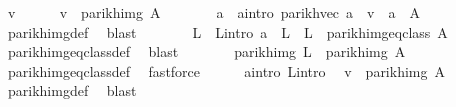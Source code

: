 \begin{isabellebody}
\ v\isanewline
\ \ \ \ \isamarkupfalse%
\ {\isachardoublequoteopen}v\ {\isasymin}\ parikh{\isacharunderscore}{\kern0pt}img\ {\isacharquery}{\kern0pt}A{\isacharprime}{\kern0pt}{\isachardoublequoteclose}\isanewline
\ \ \ \ \isamarkupfalse%
\ \isamarkupfalse%
\ a\ \ a{\isacharunderscore}{\kern0pt}intro{\isacharcolon}{\kern0pt}\ {\isachardoublequoteopen}parikh{\isacharunderscore}{\kern0pt}vec\ a\ {\isacharequal}{\kern0pt}\ v\ {\isasymand}\ a\ {\isasymin}\ {\isacharquery}{\kern0pt}A{\isacharprime}{\kern0pt}{\isachardoublequoteclose}\isanewline
\ \ \ \ \ \ \isamarkupfalse%
\ parikh{\isacharunderscore}{\kern0pt}img{\isacharunderscore}{\kern0pt}def\ \isamarkupfalse%
\ blast\isanewline
\ \ \ \ \isamarkupfalse%
\ \isamarkupfalse%
\ L\ \ L{\isacharunderscore}{\kern0pt}intro{\isacharcolon}{\kern0pt}\ {\isachardoublequoteopen}a\ {\isasymin}\ L\ {\isasymand}\ L\ {\isasymin}\ parikh{\isacharunderscore}{\kern0pt}img{\isacharunderscore}{\kern0pt}eq{\isacharunderscore}{\kern0pt}class\ A{\isachardoublequoteclose}\isanewline
\ \ \ \ \ \ \isamarkupfalse%
\ parikh{\isacharunderscore}{\kern0pt}img{\isacharunderscore}{\kern0pt}eq{\isacharunderscore}{\kern0pt}class{\isacharunderscore}{\kern0pt}def\ \isamarkupfalse%
\ blast\isanewline
\ \ \ \ \isamarkupfalse%
\ \isamarkupfalse%
\ {\isachardoublequoteopen}parikh{\isacharunderscore}{\kern0pt}img\ L\ {\isacharequal}{\kern0pt}\ parikh{\isacharunderscore}{\kern0pt}img\ A{\isachardoublequoteclose}\ \isamarkupfalse%
\ parikh{\isacharunderscore}{\kern0pt}img{\isacharunderscore}{\kern0pt}eq{\isacharunderscore}{\kern0pt}class{\isacharunderscore}{\kern0pt}def\ \isamarkupfalse%
\ fastforce\isanewline
\ \ \ \ \isamarkupfalse%
\ a{\isacharunderscore}{\kern0pt}intro\ L{\isacharunderscore}{\kern0pt}intro\ \isamarkupfalse%
\ {\isachardoublequoteopen}v\ {\isasymin}\ parikh{\isacharunderscore}{\kern0pt}img\ A{\isachardoublequoteclose}\ \isamarkupfalse%
\ parikh{\isacharunderscore}{\kern0pt}img{\isacharunderscore}{\kern0pt}def\ \isamarkupfalse%
\ blast\isanewline
\ \ \isamarkupfalse%
\isanewline
{}\isamarkupfalse%
%
\endisatagproof
{\isafoldproof}%
%
\isadelimproof
\isanewline
%
\endisadelimproof
\isanewline
\isanewline

\end{isabellebody}
